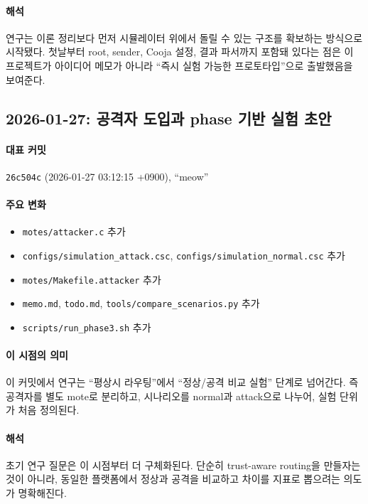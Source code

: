 \documentclass[12pt,a4paper]{article}
\begin{document}
\paragraph{해석}
연구는 이론 정리보다 먼저 시뮬레이터 위에서 돌릴 수 있는 구조를 확보하는 방식으로
시작됐다. 첫날부터 root, sender, Cooja 설정, 결과 파서까지 포함돼 있다는 점은
이 프로젝트가 아이디어 메모가 아니라 ``즉시 실험 가능한 프로토타입''으로
출발했음을 보여준다.

\subsection{2026-01-27: 공격자 도입과 phase 기반 실험 초안}

\paragraph{대표 커밋}
\texttt{26c504c} (2026-01-27 03:12:15 +0900), ``meow''

\paragraph{주요 변화}
\begin{itemize}[leftmargin=1.5em]
\item \texttt{motes/attacker.c} 추가
\item \texttt{configs/simulation\_attack.csc}, \texttt{configs/simulation\_normal.csc} 추가
\item \texttt{motes/Makefile.attacker} 추가
\item \texttt{memo.md}, \texttt{todo.md}, \texttt{tools/compare\_scenarios.py} 추가
\item \texttt{scripts/run\_phase3.sh} 추가
\end{itemize}

\paragraph{이 시점의 의미}
이 커밋에서 연구는 ``평상시 라우팅''에서 ``정상/공격 비교 실험'' 단계로 넘어간다.
즉 공격자를 별도 mote로 분리하고, 시나리오를 normal과 attack으로 나누어,
실험 단위가 처음 정의된다.

\paragraph{해석}
초기 연구 질문은 이 시점부터 더 구체화된다. 단순히 trust-aware routing을 만들자는
것이 아니라, 동일한 플랫폼에서 정상과 공격을 비교하고 차이를 지표로 뽑으려는
의도가 명확해진다.
\end{document}
